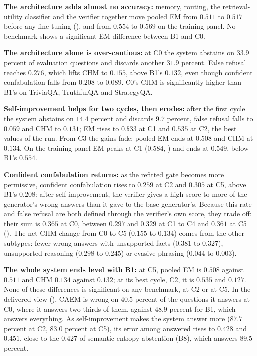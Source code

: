 \textbf{The architecture adds almost no accuracy:} memory, routing, the retrieval-utility classifier and the verifier together move pooled EM from $0.511$ to $0.517$ before any fine-tuning (), and from $0.554$ to $0.569$ on the training panel. No benchmark shows a significant EM difference between B1 and C0.

\textbf{The architecture alone is over-cautious:} at C0 the system abstains on $33.9$ percent of evaluation questions and discards another $31.9$ percent. False refusal reaches $0.276$, which lifts CHM to $0.155$, above B1's $0.132$, even though confident confabulation falls from $0.208$ to $0.089$. C0's CHM is significantly higher than B1's on TriviaQA, TruthfulQA and StrategyQA.

\textbf{Self-improvement helps for two cycles, then erodes:} after the first cycle the system abstains on $14.4$ percent and discards $9.7$ percent, false refusal falls to $0.059$ and CHM to $0.131$; EM rises to $0.533$ at C1 and $0.535$ at C2, the best values of the run. From C3 the gains fade: pooled EM ends at $0.508$ and CHM at $0.134$. On the training panel EM peaks at C1 ($0.584$, ) and ends at $0.549$, below B1's $0.554$.

\textbf{Confident confabulation returns:} as the refitted gate becomes more permissive, confident confabulation rises to $0.259$ at C2 and $0.305$ at C5, above B1's $0.208$: after self-improvement, the verifier gives a high score to more of the generator's wrong answers than it gave to the base generator's. Because this rate and false refusal are both defined through the verifier's own score, they trade off: their sum is $0.365$ at C0, between $0.297$ and $0.329$ at C1 to C4 and $0.361$ at C5 (). The net CHM change from C0 to C5 ($0.155$ to $0.134$) comes from the other subtypes: fewer wrong answers with unsupported facts ($0.381$ to $0.327$), unsupported reasoning ($0.298$ to $0.245$) or evasive phrasing ($0.044$ to $0.003$).



\textbf{The whole system ends level with B1:} at C5, pooled EM is $0.508$ against $0.511$ and CHM $0.134$ against $0.132$; at its best cycle, C2, it is $0.535$ and $0.127$. None of these differences is significant on any benchmark, at C2 or at C5. In the delivered view (), CAEM is wrong on $40.5$ percent of the questions it answers at C0, where it answers two thirds of them, against $48.9$ percent for B1, which answers everything. As self-improvement makes the system answer more ($87.7$ percent at C2, $83.0$ percent at C5), its error among answered rises to $0.428$ and $0.451$, close to the $0.427$ of semantic-entropy abstention (B8), which answers $89.5$ percent.

